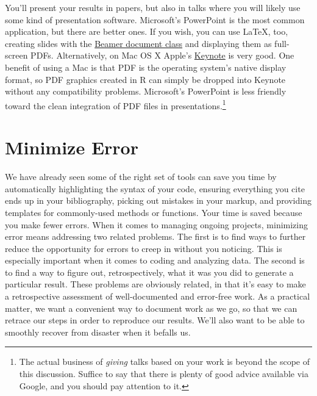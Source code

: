 \documentclass[11pt,article,oneside]{memoir}
\begin{document}
You'll present your results in papers, but also in talks where you will likely use some kind of presentation software. Microsoft's PowerPoint is the most common application, but there are better ones. If you wish, you can use LaTeX, too, creating slides with the \href{http://latex-beamer.sourceforge.net/}{Beamer document class} and displaying them as full-screen PDFs. Alternatively, on Mac OS X Apple's \href{http://www.apple.com/iwork/keynote/}{Keynote} is very good. One benefit of using a Mac is that PDF is the operating system's native display format, so PDF graphics created in R can simply be dropped into Keynote without any compatibility problems. Microsoft's PowerPoint is less friendly toward the clean integration of PDF files in presentations.\footnote{The actual business of \emph{giving} talks based on your work is beyond the scope of this discussion. Suffice to say that there is plenty of good advice available via Google, and you should pay attention to it.} 
                          
\section{Minimize Error}  
We have already seen some of the right set of tools can save you time by automatically highlighting the syntax of your code, ensuring everything you cite ends up in your bibliography, picking out mistakes in your markup, and providing templates for commonly-used methods or functions. Your time is saved because you make fewer errors. When it comes to managing ongoing projects, minimizing error means addressing two related problems. The first is to find ways to further reduce the opportunity for errors to creep in without you noticing. This is especially important when it comes to coding and analyzing data. The second is to find a way to figure out, retrospectively, what it was you did to generate a particular result. These problems are obviously related, in that it's easy to make a retrospective assessment of  well-documented and error-free work. As a practical matter, we want a convenient way to document work as we go, so that we can retrace our steps in order to reproduce our results. We'll also want to be able to smoothly recover from disaster when it befalls us.
 
\end{document}
